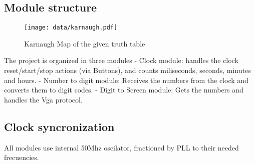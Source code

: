 \newpage



\subsection*{Module structure}
\begin{figure}[htbp]
    \begin{center}
    \texttt{[image: data/karnaugh.pdf]}
    
    \end{center}
    
    \caption{Karnaugh Map of the given truth table}
    \label{fig:KarnaughMap}
    \end{figure}

The project is organized in three modules
- Clock module: handles the clock reset/start/stop actions (via Buttons), and counts miliseconds, seconds, minutes and hours.
- Number to digit module: Receives the numbers from the clock and converts them to digit codes.
- Digit to Screen module: Gets the numbers and handles the Vga protocol. 


\subsection*{Clock syncronization}

All modules use internal 50Mhz oscilator, fractioned by PLL to their needed frecuencies.

